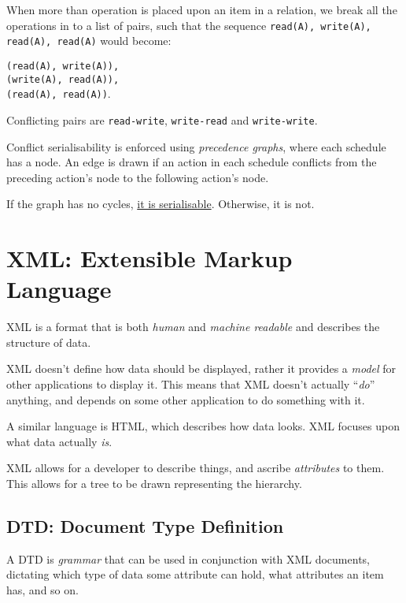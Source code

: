 \documentclass{article}
\begin{document}
When more than operation is placed upon an item in a relation, we break all the operations in to a list of pairs, such that the sequence \texttt{read(A), write(A), read(A), read(A)} would become:

\texttt{(read(A), write(A)),\\ (write(A), read(A)),\\ (read(A), read(A))}.

Conflicting pairs are \texttt{read-write}, \texttt{write-read} and \texttt{write-write}. 

Conflict serialisability is enforced using \textit{precedence graphs}, where each schedule has a node. An edge is drawn if an action in each schedule conflicts from the preceding action's node to the following action's node.

If the graph has no cycles, \underline{it is serialisable}. Otherwise, it is not.

\filbreak
\section{XML: Extensible Markup Language}

XML is a format that is both \textit{human} and \textit{machine readable} and describes the structure of data.

XML doesn't define how data should be displayed, rather it provides a \textit{model} for other applications to display it. This means that XML doesn't actually ``\textit{do}'' anything, and depends on some other application to do something with it.

A similar language is HTML, which describes how data looks. XML focuses upon what data actually \textit{is}.

XML allows for a developer to describe things, and ascribe \textit{attributes} to them. This allows for a tree to be drawn representing the hierarchy.

\subsection{DTD: Document Type Definition}

A DTD is \textit{grammar} that can be used in conjunction with XML documents, dictating which type of data some attribute can hold, what attributes an item has, and so on.
\end{document}
